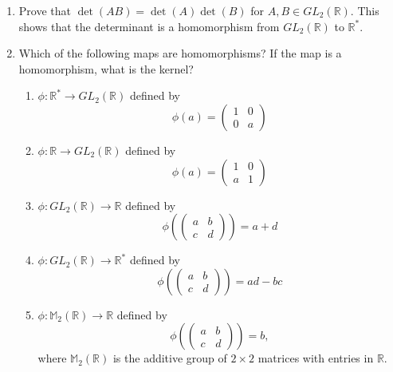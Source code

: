 {\small
 
 
\begin{enumerate}
 
 
 
\item
Prove that $\det( AB) = \det(A) \det(B)$ for $A, B \in GL_2( {\mathbb R}
)$. This shows that the determinant is a homomorphism from $GL_2(
{\mathbb R} )$ to ${\mathbb R}^*$. 
 
 
 
\item
Which of the following maps are homomorphisms? If the map is a
homomorphism, what is the kernel? 
\begin{enumerate}
 
 \item
$\phi : {\mathbb R}^\ast \rightarrow GL_2 ( {\mathbb R})$ defined by
\[
\phi( a ) =
\begin{pmatrix}
1 & 0 \\
0 & a
\end{pmatrix}
\]
 
 \item
$\phi : {\mathbb R} \rightarrow GL_2 ( {\mathbb R})$ defined by
\[
\phi( a ) =
\begin{pmatrix}
1 & 0 \\
a & 1
\end{pmatrix}
\]
 
 \item
$\phi : GL_2 ({\mathbb R})   \rightarrow {\mathbb R}$ defined by
\[
\phi
\left(
\begin{pmatrix}
a & b \\
c & d
\end{pmatrix}
\right)
= a + d
\]
 
 \item
$\phi : GL_2 ( {\mathbb R})   \rightarrow {\mathbb R}^\ast$ defined by 
\[
\phi
\left(
\begin{pmatrix}
a & b \\
c & d
\end{pmatrix}
\right)
= ad -bc
\]
 
 \item
$\phi : {\mathbb M}_2( {\mathbb R})   \rightarrow {\mathbb R}$ defined by
\[
\phi
\left(
\begin{pmatrix}
a & b \\
c & d
\end{pmatrix}
\right)
= b,
\]
where ${\mathbb M}_2( {\mathbb R})$ is the additive group of $2 \times 2$ matrices with entries in ${\mathbb R}$.
 

\end{enumerate}
\end{enumerate}}
